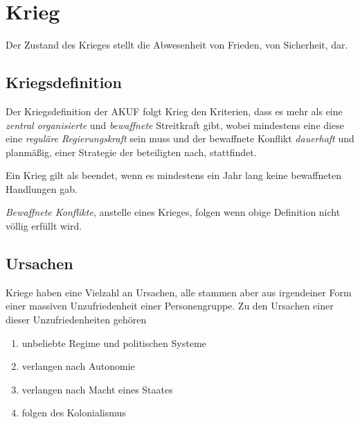 \documentclass{article}
\begin{document}
\section{Krieg} 
Der Zustand des Krieges stellt die Abwesenheit von Frieden, von Sicherheit, dar.
 
\subsection{Kriegsdefinition} 
Der Kriegsdefinition der AKUF folgt Krieg den Kriterien, dass es mehr als eine \emph{zentral organisierte} und \emph{bewaffnete} Streitkraft gibt, wobei mindestens eine diese eine \emph{reguläre Regierungskraft} sein muss und der bewaffnete Konflikt \emph{dauerhaft} und planmäßig, einer Strategie der beteiligten nach, stattfindet. 
 
Ein Krieg gilt als beendet, wenn es mindestens ein Jahr lang keine bewaffneten Handlungen gab.
 
\emph{Bewaffnete Konflikte}, anstelle eines Krieges, folgen wenn obige Definition nicht völlig erfüllt wird.
 
\subsection{Ursachen}
Kriege haben eine Vielzahl an Ursachen, alle stammen aber aus irgendeiner Form einer massiven Unzufriedenheit einer Personengruppe. Zu den Ursachen einer dieser Unzufriedenheiten gehören
\begin{enumerate}
 \item unbeliebte Regime und politischen Systeme
 \item verlangen nach Autonomie
 \item verlangen nach Macht eines Staates
 \item folgen des Kolonialismus 
\end{enumerate}   
\end{document}
